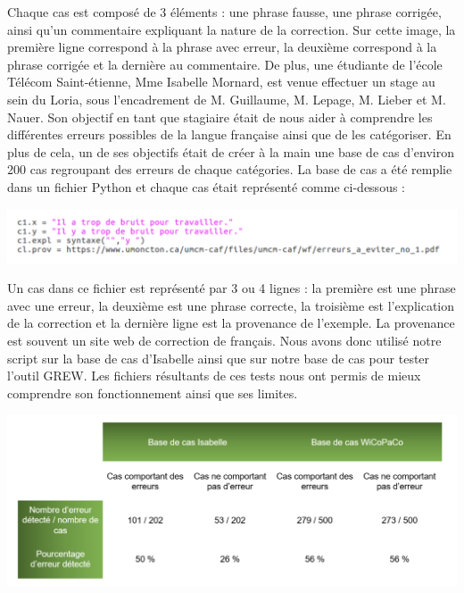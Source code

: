 \documentclass{article}
\begin{document}
Chaque cas est compos\'{e} de 3 \'{e}l\'{e}ments : une phrase fausse, une phrase corrig\'{e}e, ainsi qu'un commentaire expliquant la nature de la correction. Sur cette image, la premi\`{e}re ligne correspond \`{a} la phrase avec erreur, la deuxi\`{e}me correspond \`{a} la phrase corrig\'{e}e et la derni\`{e}re au commentaire.
\newline
\newline
De plus, une \'{e}tudiante de l'\'{e}cole T\'{e}l\'{e}com Saint-\'{e}tienne, Mme Isabelle Mornard, est venue effectuer un stage au sein du Loria, sous l'encadrement de M. Guillaume, M. Lepage, M. Lieber et M. Nauer. Son objectif en tant que stagiaire \'{e}tait de nous aider \`{a} comprendre les diff\'{e}rentes erreurs possibles de la langue fran\c{c}aise ainsi que de les cat\'{e}goriser. En plus de cela, un de ses objectifs \'{e}tait de cr\'{e}er \`{a} la main une base de cas d'environ 200 cas regroupant des erreurs de chaque cat\'{e}gories. La base de cas a \'{e}t\'{e} remplie dans un fichier Python et chaque cas \'{e}tait repr\'{e}sent\'{e} comme ci-dessous :

\begin{center}
\includegraphics[width=14cm]{exemple2.png} %
\end{center}

Un cas dans ce fichier est repr\'{e}sent\'{e} par 3 ou 4 lignes : la premi\`{e}re est une phrase avec une erreur, la deuxi\`{e}me est une phrase correcte, la troisi\`{e}me est l'explication de la correction et la derni\`{e}re ligne est la provenance de l'exemple. La provenance est souvent un site web de correction de fran\c{c}ais. Nous avons donc utilis\'{e} notre script sur la base de cas d'Isabelle ainsi que sur notre base de cas pour tester l'outil GREW. Les fichiers r\'{e}sultants de ces tests nous ont permis de mieux comprendre son fonctionnement ainsi que ses limites.

\begin{center}
\includegraphics[width=14cm]{exemple3.png} %
\end{center}
\end{document}
